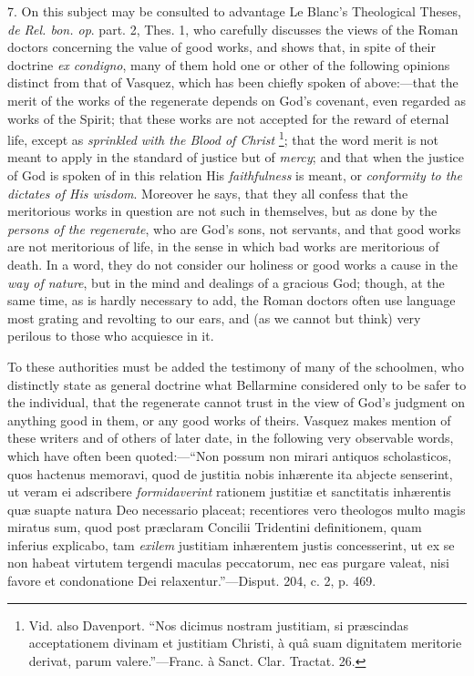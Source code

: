 7. On this subject may be consulted to advantage Le Blanc's
Theological Theses, \emph{de Rel. bon. op}. part. 2, Thes. 1, who
carefully discusses the views of the Roman doctors concerning the
value of good works, and shows that, in spite of their doctrine \emph{ex
condigno}, many of them hold one or other of the following opinions
distinct from that of Vasquez, which has been chiefly spoken of above:—that
the merit of the works of the regenerate depends on God's covenant,
even regarded as works of the Spirit; that these works are not
accepted for the reward of eternal life, except as \emph{sprinkled with
the Blood of Christ} \footnote{Vid. also
Davenport. ``Nos dicimus nostram justitiam, si præscindas
acceptationem divinam et justitiam Christi, à quâ suam dignitatem
meritorie derivat, parum valere.''—Franc. à Sanct. Clar.
Tractat. 26.};
that the word merit is not meant to apply in the standard of justice
but of \emph{mercy}; and that when the justice of God is spoken of in
this relation His \emph{faithfulness} is meant, or \emph{conformity to
the dictates of His wisdom}. Moreover he says, that they all
confess that the meritorious works in question are not such in
themselves, but as done by the \emph{persons of the regenerate},
who are God's sons, not servants, and that good works are not
meritorious of life, in the sense in which bad works are meritorious
of death. In a word, they do not consider our holiness or good works a
cause in the \emph{way of nature}, but in the mind and dealings of a
gracious God; though, at the same time, as is hardly necessary to add,
the Roman doctors often use language most grating and revolting to our
ears, and (as we cannot but think) very perilous to those who
acquiesce in it.

To these authorities must be added the testimony of many of the
schoolmen, who distinctly state as general doctrine what Bellarmine
considered only to be safer to the individual, that the regenerate
cannot trust in the view of God's judgment on anything good in them,
or any good works of theirs. Vasquez makes mention of these writers
and of others of later date, in the following very observable words,
which have often been quoted:—``Non possum non mirari antiquos
scholasticos, quos hactenus memoravi, quod de justitia nobis
inhærente ita abjecte senserint, ut veram ei adscribere \emph{formidaverint}
rationem justitiæ et sanctitatis inhærentis quæ suapte natura Deo
necessario placeat; recentiores vero theologos multo magis miratus
sum, quod post præclaram Concilii Tridentini definitionem, quam
inferius explicabo, tam \emph{exilem} justitiam inhærentem justis
concesserint, ut ex se non habeat virtutem tergendi maculas peccatorum,
nec eas purgare valeat, nisi favore et condonatione Dei relaxentur.''—Disput.
204, c. 2, p. 469.

